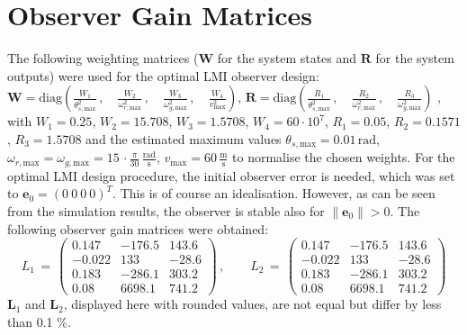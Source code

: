 \documentclass[a4paper]{article}
\newcommand{\B}[1]{\mathbf{#1}}
\begin{document}
\section{\label{Sec_ObserverGains}Observer Gain Matrices}

The following weighting matrices ($\B{W}$ for the system states and $\B{R}$ for the system outputs) were used for the optimal LMI observer design:
\newline $\B{W} = \text{diag}\left(\frac{W_1}{\theta^2_{s,\text{max}}} \, , \quad \frac{W_2}{\omega^2_{r,\text{max}}} \, , \quad
							\frac{W_3}{\omega^2_{g,\text{max}}} \, , \quad \frac{W_4}{v^2_\text{max}} \right)$,
$\B{R} = \text{diag}\left(\frac{R_1}{\theta^2_{s,\text{max}}} \, , \quad \frac{R_2}{\omega^2_{r,\text{max}}} \, , \quad \frac{R_3}{\omega^2_{g,\text{max}}}\right)$ , 
\newline with $W_1    = 0.25$, $W_2    = 15.708$, $W_3    = 1.5708$, $W_4    = 60 \cdot 10^7$, $R_1    = 0.05$, $R_2    = 0.1571$, $R_3    = 1.5708$ and the estimated maximum values
\newline $\theta_{s,\text{max}} = 0.01 \, \text{rad}$, 
$\omega_{r,\text{max}} = \omega_{g,\text{max}} = 15\,\cdot \frac{\pi}{30} \, \frac{\text{rad}}{\text{s}}$,
$v_\text{max} = 60\, \frac{\text{m}}{\text{s}}$ to normalise the chosen weights.
\newline For the optimal LMI design procedure, the initial observer error is needed, which was set to $\B{e}_0=\left(0 \: 0 \: 0 \: 0\right)^T$. This is of course an idealisation. However, as can be seen from the simulation results, the observer is stable also for $\|\B{e}_0\| > 0$.
\newline The following observer gain matrices were obtained:
\begin{equation}
L_1 \, = \, \begin{pmatrix}
				0.147  		&	-176.5		&	143.6	\\
				-0.022		&	133			&	-28.6	\\
				0.183		&	-286.1		&	303.2	\\
				0.08		&	6698.1		&	741.2
			\end{pmatrix} \, , \qquad
L_2 \, = \, \begin{pmatrix}
				0.147  		&	-176.5		&	143.6	\\
				-0.022		&	133			&	-28.6	\\
				0.183		&	-286.1		&	303.2	\\
				0.08		&	6698.1		&	741.2
			\end{pmatrix}
\label{Eqn_L_Matrices}
\end{equation}
\newline $\B{L}_1$ and $\B{L}_2$, displayed here with rounded values, are not equal but differ by less than 0.1 \%.




\end{document}

